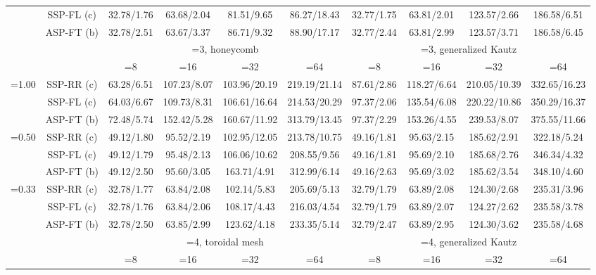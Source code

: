 \documentclass[10pt,twocolumn,journal]{IEEEtran}
\begin{document}
\begin{table*}[t!]
{\begin{tabular}{|c|c|c|c|c|c|c|c|c|c|}
& SSP-FL (c) & \cellcolor[gray]{0.7} 32.78/1.76 & 63.68/2.04 & 81.51/9.65 & 86.27/18.43 & \cellcolor[gray]{0.7} 32.77/1.75 & 63.81/2.01 & 123.57/2.66 & 186.58/6.51 \\
& ASP-FT (b) & 32.78/2.51 & 63.67/3.37 & 86.71/9.32 & 88.90/17.17 & 32.77/2.44 & 63.81/2.99 & 123.57/3.71 & 186.58/6.45 \\
\hline
\hline
& 	 & \multicolumn{4}{c|}{=3, honeycomb} & \multicolumn{4}{c|}{=3, generalized Kautz} \\
\hline
& 	 & =8 & =16 & =32 & =64 & =8 & =16 & =32 & =64 \\
\hline
\multirow{3}{*}{=1.00} & SSP-RR (c) & 63.28/6.51 & 107.23/8.07 & 103.96/20.19 & \cellcolor[gray]{0.8} 219.19/21.14 & 87.61/2.86 & 118.27/6.64 & 210.05/10.39 & 332.65/16.23 \\
& SSP-FL (c) & 64.03/6.67 & 109.73/8.31 & 106.61/16.64 & 214.53/20.29 & 97.37/2.06 & 135.54/6.08 & 220.22/10.86 & \cellcolor[gray]{0.8} 350.29/16.37 \\
& ASP-FT (b) & 72.48/5.74 & 152.42/5.28 & 160.67/11.92 & \cellcolor[gray]{0.9} 313.79/13.45 & 97.37/2.29 & 153.26/4.55 & 239.53/8.07 & \cellcolor[gray]{0.9} 375.55/11.66 \\
\hline
\multirow{3}{*}{=0.50} & SSP-RR (c) & 49.12/1.80 & 95.52/2.19 & 102.95/12.05 & 213.78/10.75 & 49.16/1.81 & 95.63/2.15 & 185.62/2.91 & 322.18/5.24 \\
& SSP-FL (c) & 49.12/1.79 & 95.48/2.13 & 106.06/10.62 & 208.55/9.56 & 49.16/1.81 & 95.69/2.10 & 185.68/2.76 & 346.34/4.32 \\
& ASP-FT (b) & 49.12/2.50 & 95.60/3.05 & 163.71/4.91 & 312.99/6.14 & 49.16/2.63 & 95.69/3.02 & 185.62/3.54 & 348.10/4.60 \\
\hline
\multirow{3}{*}{=0.33} & SSP-RR (c) & 32.78/1.77 & 63.84/2.08 & 102.14/5.83 & 205.69/5.13 & \cellcolor[gray]{0.7} 32.79/1.79 & 63.89/2.08 & 124.30/2.68 & 235.31/3.96 \\
& SSP-FL (c) & \cellcolor[gray]{0.7} 32.78/1.76 & 63.84/2.06 & 108.17/4.43 & 216.03/4.54 & \cellcolor[gray]{0.7} 32.79/1.79 & 63.89/2.07 & 124.27/2.62 & 235.58/3.78 \\
& ASP-FT (b) & 32.78/2.50 & 63.85/2.99 & 123.62/4.18 & 233.35/5.14 & 32.79/2.47 & 63.89/2.95 & 124.30/3.62 & 235.58/4.68 \\
\hline
\hline
& 	 & \multicolumn{4}{c|}{=4, toroidal mesh} & \multicolumn{4}{c|}{=4, generalized Kautz} \\
\hline
& 	 & =8 & =16 & =32 & =64 & =8 & =16 & =32 & =64 \\

\end{tabular}}
\end{table*}
\end{document}
